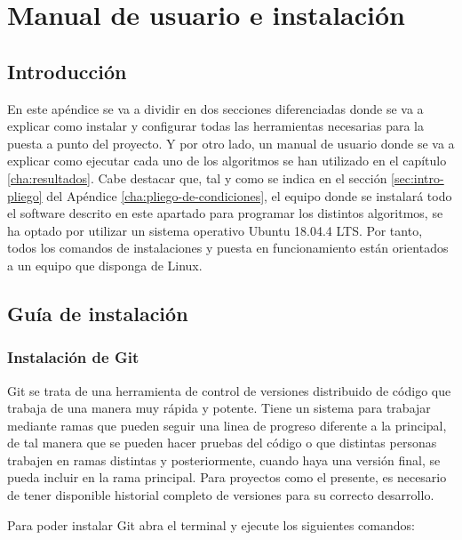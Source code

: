 
\chapter{Manual de usuario e instalación}
\label{cha:manual-usuario-instalacion}

\section{Introducción}
\label{sec:intro-manual-de-usuario}

En este apéndice se va a dividir en dos secciones diferenciadas donde se va a explicar como instalar y configurar todas las herramientas necesarias para la puesta a punto del proyecto. Y por otro lado, un manual de usuario donde se va a explicar como ejecutar cada uno de los algoritmos se han utilizado en el capítulo \ref{cha:resultados}.
Cabe destacar que, tal y como se indica en el sección \ref{sec:intro-pliego} del Apéndice \ref{cha:pliego-de-condiciones}, el equipo donde se instalará todo el software descrito en este apartado para programar los distintos algoritmos, se ha optado por utilizar un sistema operativo Ubuntu 18.04.4 LTS. Por tanto, todos los comandos de instalaciones y puesta en funcionamiento están orientados a un equipo que disponga de Linux.


\section{Guía de instalación}
\label{sec:sec-guia-instalacion}

\subsection{Instalación de Git}
\label{subsec:instalacion-git}

Git se trata de una herramienta de control de versiones distribuido de código que trabaja de una manera muy rápida y potente. Tiene un sistema para trabajar mediante ramas que pueden seguir una linea de progreso diferente a la principal, de tal manera que se pueden hacer pruebas del código o que distintas personas trabajen en ramas distintas y posteriormente, cuando haya una versión final, se pueda incluir en la rama principal. Para proyectos como el presente, es necesario de tener disponible historial completo de versiones para su correcto desarrollo.

Para poder instalar Git abra el terminal y ejecute los siguientes comandos:

